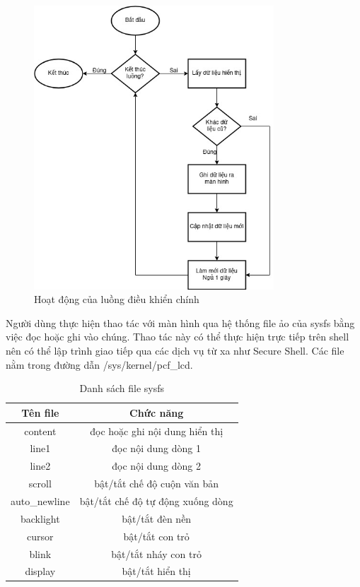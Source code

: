 \documentclass{report}
\begin{document}
\begin{figure}[H]
	\centering
	\includegraphics[width=0.8\textwidth]{../images/driver-work-thread.jpg}
	\caption{Hoạt động của luồng điều khiển chính}
	\label{main-thread}
\end{figure}

Người dùng thực hiện thao tác với màn hình qua hệ thống file ảo của sysfs bằng việc đọc hoặc ghi vào chúng. Thao tác này có thể thực hiện trực tiếp trên shell nên có thể lập trình giao tiếp qua các dịch vụ từ xa như Secure Shell. Các file nằm trong đường dẫn /sys/kernel/pcf\_lcd.
\begin{table}[H]
	\centering
	\caption{Danh sách file sysfs}
	\begin{tabular}{|c|c|}
		\hline
		\textbf{Tên file} & \textbf{Chức năng}\\
		\hline
		content & đọc hoặc ghi nội dung hiển thị\\
		line1 & đọc nội dung dòng 1\\
		line2 & đọc nội dung dòng 2\\
		scroll & bật/tắt chế độ cuộn văn bản\\
		auto\_newline & bật/tắt chế độ tự động xuống dòng\\
		backlight & bật/tắt đèn nền \\
		cursor & bật/tắt con trỏ \\
		blink & bật/tắt nháy con trỏ\\
		display & bật/tắt hiển thị\\
		\hline		
	\end{tabular}
\end{table}
\end{document}
